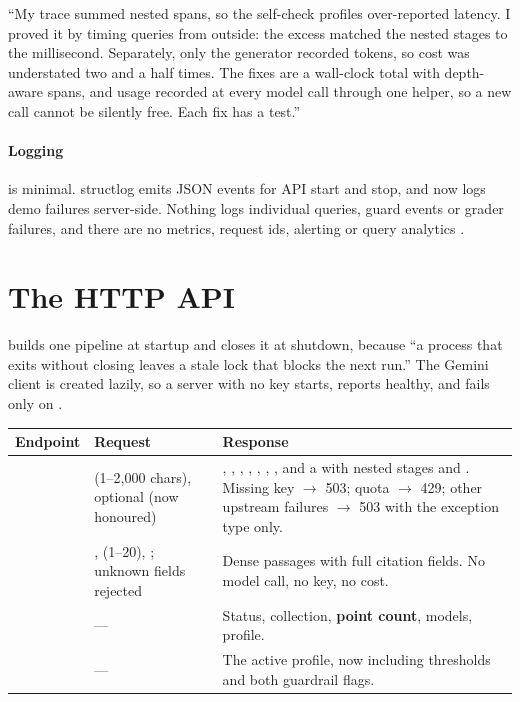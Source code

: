 \begin{interview}
``My trace summed nested spans, so the self-check profiles over-reported latency. I proved it by timing queries from outside: the excess matched the nested stages to the millisecond. Separately, only the generator recorded tokens, so cost was understated two and a half times. The fixes are a wall-clock total with depth-aware spans, and usage recorded at every model call through one helper, so a new call cannot be silently free. Each fix has a test.''
\end{interview}

\paragraph{Logging} is minimal. structlog emits JSON events for API start and stop, and now logs demo failures server-side. Nothing logs individual queries, guard events or grader failures, and there are no metrics, request ids, alerting or query analytics \tagR.

\section{The HTTP API}
\label{sec:api}

 builds one pipeline at startup and closes it at shutdown, because ``a process that exits without closing leaves a stale lock that blocks the next run.'' The Gemini client is created lazily, so a server with no key starts, reports healthy, and fails only on  .

\begin{center}\small
\begin{tabularx}{\textwidth}{@{}>{\raggedright\arraybackslash}p{2.4cm}>{\raggedright\arraybackslash}p{4.4cm}L@{}}
\toprule
\textbf{Endpoint} & \textbf{Request} & \textbf{Response}\\
\midrule
{} &  (1--2,000 chars), optional  (now honoured) & , , , , , , , and a  with nested stages and . Missing key $\rightarrow$ 503; quota $\rightarrow$ 429; other upstream failures $\rightarrow$ 503 with the exception type only.\\
 & ,  (1--20), ; unknown fields rejected & Dense passages with full citation fields. No model call, no key, no cost.\\
 & --- & Status, collection, \textbf{point count}, models, profile.\\
 & --- & The active profile, now including thresholds and both guardrail flags.\\
\bottomrule
\end{tabularx}
\end{center}

